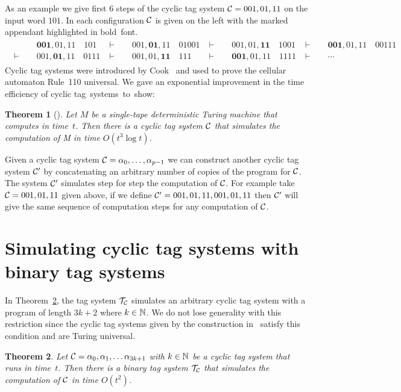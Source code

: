 \documentclass[11pt]{article} \usepackage{amsfonts,amsmath,amssymb,amsthm}
\newtheorem{theorem}{Theorem}
\begin{document}
As an example we give first 6 steps of the cyclic tag system $\mathcal{C}=001,01,11$ on the input word $101$. In each configuration $\mathcal{C}$ is given on the left with the marked  appendant highlighted in bold~font.
\begin{eqnarray*}
\begin{split}
& \pmb{001},01,11\quad 101  & \;\vdash\;\quad  & 001,\pmb{01},11\quad 01001 &\;\vdash\;\quad  &001,01,\pmb{11}\quad 1001 & \;\vdash\;\quad  & \pmb{001},01,11\quad 00111\\ 
 \;\vdash\;\quad  & 001,\pmb{01},11\quad 0111 & \;\vdash\;\quad  & 001,01,\pmb{11}\quad 111 & \;\vdash\;\quad  & \pmb{001},01,11\quad 1111 & \;\vdash\;\quad &\cdots
\end{split}
\end{eqnarray*}
Cyclic tag systems were introduced by Cook~\cite{Cook2004} and used to prove the cellular automaton Rule~110 universal. We gave an exponential improvement in the time efficiency of cyclic tag~systems~to~show:
\begin{theorem}[\cite{NearyWoods2006C}]\label{thm:CTS simulate TMs}
Let $M$ be a single-tape deterministic Turing machine that computes in time~$t$. Then there is a cyclic tag system $\mathcal{C}$ that simulates the computation of M in time $O(t^3 \log t)$. 
\end{theorem}
Given a cyclic tag system $\mathcal{C}=\alpha_0,\ldots,\alpha_{p-1}$ we can construct another cyclic tag system $\mathcal{C}'$ by concatenating an arbitrary number of copies of the program for $\mathcal{C}$. The system $\mathcal{C}'$ simulates step for step the computation of $\mathcal{C}$. For example take $\mathcal{C}=001,01,11$ given above, if we define $\mathcal{C}'=001,01,11,001,01,11$ then $\mathcal{C}'$ will give the same sequence of computation steps for any computation of $\mathcal{C}$.

\section{Simulating cyclic tag systems with binary tag systems}\label{sec:simulating CTS with TS} 

In Theorem~\ref{thm:main theorem}, the tag system $\mathcal{T_{\mathcal{C}}}$ simulates an arbitrary cyclic tag system with a program of length $3k+2$ where $k\in\mathbb{N}$. 
We do not lose generality with this restriction since the cyclic tag systems given by the construction in~\cite{NearyWoods2006C} satisfy this condition and are Turing universal. 


\begin{theorem}\label{thm:main theorem}
Let $\mathcal{C}=\alpha_0,\alpha_1,\ldots\alpha_{3k+1}$ with $k\in\mathbb{N}$ be a cyclic tag system that runs in time~$t$. Then there is a binary tag system $\mathcal{T_{\mathcal{C}}}$ that simulates the computation of $\mathcal{C}$ in time $O(t^2)$.
\end{theorem}
\end{document}
